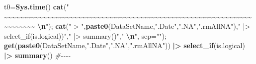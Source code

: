\documentclass[
]{article}
\newenvironment{Shaded}{\begin{snugshade}}{\end{snugshade}}
\newcommand{\AttributeTok}[1]{\textcolor[rgb]{0.13,0.29,0.53}{#1}}
\newcommand{\CommentTok}[1]{\textcolor[rgb]{0.56,0.35,0.01}{\textit{#1}}}
\newcommand{\FunctionTok}[1]{\textcolor[rgb]{0.13,0.29,0.53}{\textbf{#1}}}
\newcommand{\NormalTok}[1]{#1}
\newcommand{\OtherTok}[1]{\textcolor[rgb]{0.56,0.35,0.01}{#1}}
\newcommand{\SpecialCharTok}[1]{\textcolor[rgb]{0.81,0.36,0.00}{\textbf{#1}}}
\newcommand{\StringTok}[1]{\textcolor[rgb]{0.31,0.60,0.02}{#1}}
\begin{document}
\begin{Shaded}
\begin{Highlighting}[]
\NormalTok{t0}\OtherTok{=}\FunctionTok{Sys.time}\NormalTok{()}
\FunctionTok{cat}\NormalTok{(}\StringTok{"    \textasciitilde{}\textasciitilde{}\textasciitilde{}\textasciitilde{}\textasciitilde{}\textasciitilde{}\textasciitilde{}\textasciitilde{}\textasciitilde{}\textasciitilde{}\textasciitilde{}\textasciitilde{}\textasciitilde{}\textasciitilde{}\textasciitilde{}\textasciitilde{}\textasciitilde{}\textasciitilde{}\textasciitilde{}\textasciitilde{}\textasciitilde{}\textasciitilde{}\textasciitilde{}\textasciitilde{}\textasciitilde{}\textasciitilde{}\textasciitilde{}\textasciitilde{}\textasciitilde{}\textasciitilde{}\textasciitilde{}\textasciitilde{}\textasciitilde{}\textasciitilde{}\textasciitilde{}\textasciitilde{}\textasciitilde{}\textasciitilde{}\textasciitilde{}\textasciitilde{}\textasciitilde{}\textasciitilde{}\textasciitilde{}\textasciitilde{}\textasciitilde{}\textasciitilde{}\textasciitilde{}\textasciitilde{}\textasciitilde{}\textasciitilde{}\textasciitilde{}\textasciitilde{}\textasciitilde{}\textasciitilde{}\textasciitilde{}\textasciitilde{}\textasciitilde{}\textasciitilde{}\textasciitilde{}\textasciitilde{}\textasciitilde{}\textasciitilde{}\textasciitilde{}\textasciitilde{}\textasciitilde{}\textasciitilde{}\textasciitilde{}\textasciitilde{}\textasciitilde{}\textasciitilde{}\textasciitilde{}\textasciitilde{}    }\SpecialCharTok{\textbackslash{}n}\StringTok{"}\NormalTok{); }\FunctionTok{cat}\NormalTok{(}\StringTok{" \textgreater{} "}\NormalTok{,}\FunctionTok{paste0}\NormalTok{(DataSetName,}\StringTok{".Date"}\NormalTok{,}\StringTok{".NA"}\NormalTok{,}\StringTok{".rmAllNA"}\NormalTok{),}\StringTok{" |\textgreater{} select\_if(is.logical))"}\NormalTok{,}\StringTok{" |\textgreater{} summary()"}\NormalTok{,}\StringTok{"  }\SpecialCharTok{\textbackslash{}n}\StringTok{"}\NormalTok{, }\AttributeTok{sep=}\StringTok{""}\NormalTok{); }\FunctionTok{get}\NormalTok{(}\FunctionTok{paste0}\NormalTok{(DataSetName,}\StringTok{".Date"}\NormalTok{,}\StringTok{".NA"}\NormalTok{,}\StringTok{".rmAllNA"}\NormalTok{)) }\SpecialCharTok{|\textgreater{}} \FunctionTok{select\_if}\NormalTok{(is.logical) }\SpecialCharTok{|\textgreater{}} \FunctionTok{summary}\NormalTok{() }\CommentTok{\#{-}{-}{-}{-}  }

\end{Highlighting}
\end{Shaded}
\end{document}
